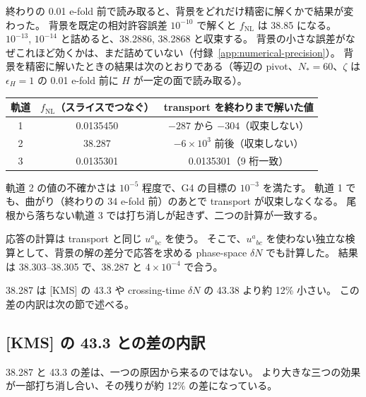 \documentclass[a4paper,11pt]{ltjsarticle}
\newcommand{\fnl}{f_{\mathrm{NL}}}
\begin{document}
終わりの 0.01 e-fold 前で読み取ると、背景をどれだけ精密に解くかで結果が変わった。
背景を既定の相対許容誤差 $10^{-10}$ で解くと $\fnl$ は 38.85 になる。
$10^{-13}$, $10^{-14}$ と詰めると、38.2886, 38.2868 と収束する。
背景の小さな誤差がなぜこれほど効くかは、まだ詰めていない（付録~\ref{app:numerical-precision}）。
背景を精密に解いたときの結果は次のとおりである（等辺の pivot、$N_*=60$、$\zeta$ は $\epsilon_H=1$ の 0.01 e-fold 前に $H$ が一定の面で読み取る）。
\begin{center}
\begin{tabular}{ccc}
\toprule
軌道 & $\fnl$（スライスでつなぐ） & transport を終わりまで解いた値 \\
\midrule
1 & 0.0135450 & $-287$ から $-304$（収束しない） \\
2 & 38.287 & $-6\times10^3$ 前後（収束しない） \\
3 & 0.0135301 & 0.0135301（9 桁一致） \\
\bottomrule
\end{tabular}
\end{center}
軌道 2 の値の不確かさは $10^{-5}$ 程度で、G4 の目標の $10^{-3}$ を満たす。
軌道 1 でも、曲がり（終わりの 34 e-fold 前）のあとで transport が収束しなくなる。
尾根から落ちない軌道 3 では打ち消しが起きず、二つの計算が一致する。

応答の計算は transport と同じ $u^a{}_{bc}$ を使う。
そこで、$u^a{}_{bc}$ を使わない独立な検算として、背景の解の差分で応答を求める phase-space $\delta N$ でも計算した。
結果は 38.303--38.305 で、38.287 と $4\times10^{-4}$ で合う。

38.287 は [KMS] の 43.3 や crossing-time $\delta N$ の 43.38 より約 12\% 小さい。
この差の内訳は次の節で述べる。

\subsection{[KMS] の 43.3 との差の内訳}
\label{sec:kms-gap}

38.287 と 43.3 の差は、一つの原因から来るのではない。
より大きな三つの効果が一部打ち消し合い、その残りが約 12\% の差になっている。
\end{document}
